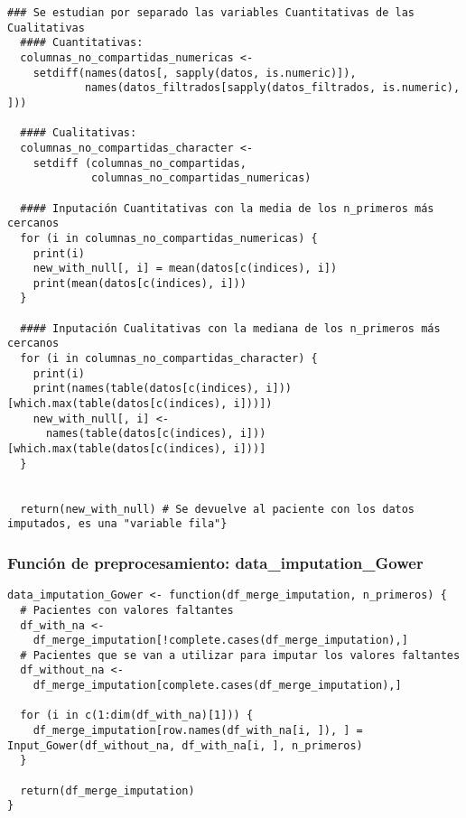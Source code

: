 \begin{lstlisting}[style=mystyle,caption={Input\_Gower.R}, label={lst:input-gower-fun}]
  ### Se estudian por separado las variables Cuantitativas de las Cualitativas
  #### Cuantitativas:
  columnas_no_compartidas_numericas <-
    setdiff(names(datos[, sapply(datos, is.numeric)]),
            names(datos_filtrados[sapply(datos_filtrados, is.numeric), ]))
  
  #### Cualitativas:
  columnas_no_compartidas_character <-
    setdiff (columnas_no_compartidas,
             columnas_no_compartidas_numericas)
  
  #### Inputación Cuantitativas con la media de los n_primeros más cercanos
  for (i in columnas_no_compartidas_numericas) {
    print(i)
    new_with_null[, i] = mean(datos[c(indices), i])
    print(mean(datos[c(indices), i]))
  }
  
  #### Inputación Cualitativas con la mediana de los n_primeros más cercanos
  for (i in columnas_no_compartidas_character) {
    print(i)
    print(names(table(datos[c(indices), i]))[which.max(table(datos[c(indices), i]))])
    new_with_null[, i] <-
      names(table(datos[c(indices), i]))[which.max(table(datos[c(indices), i]))]
  }
  
  
  return(new_with_null) # Se devuelve al paciente con los datos imputados, es una "variable fila"}
\end{lstlisting}


\newpage

\subsubsection{Función de preprocesamiento: data\_imputation\_Gower}\label{sec:codigo-input-gower-fun-preprocesamiento}

\begin{lstlisting}[style=mystyle,caption={data\_imputation\_Gower.R}, label={lst:input-gower-fun-preprocesamiento}]
  data_imputation_Gower <- function(df_merge_imputation, n_primeros) {
  # Pacientes con valores faltantes
  df_with_na <-
    df_merge_imputation[!complete.cases(df_merge_imputation),]
  # Pacientes que se van a utilizar para imputar los valores faltantes
  df_without_na <-
    df_merge_imputation[complete.cases(df_merge_imputation),]
  
  for (i in c(1:dim(df_with_na)[1])) {
    df_merge_imputation[row.names(df_with_na[i, ]), ] = Input_Gower(df_without_na, df_with_na[i, ], n_primeros)
  }
  
  return(df_merge_imputation)
}
\end{lstlisting}

\vspace{-5pt}
